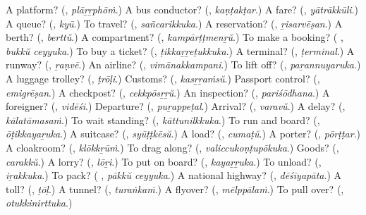 \begin{tcolorbox}[breakable,colback=teal!4,colframe=teal!35!black,title={Before you move on}]
A platform? (\textbf{}, \emph{plāṟṟphōṁ}.) A bus conductor? (\textbf{}, \emph{kaṇṭakṭar}.) A fare? (\textbf{}, \emph{yātrākkūli}.) A queue? (\textbf{}, \emph{kyū}.) To travel? (\textbf{}, \emph{sañcarikkuka}.) A reservation? (\textbf{}, \emph{ṟisarvēṣan}.) A berth? (\textbf{}, \emph{berttŭ}.) A compartment? (\textbf{}, \emph{kampārṭṭmenṟŭ}.) To make a booking? (\textbf{ }, \emph{bukkŭ ceyyuka}.) To buy a ticket? (\textbf{}, \emph{ṭikkaṟṟeṭukkuka}.) A terminal? (\textbf{}, \emph{ṭerminal}.) A runway? (\textbf{}, \emph{ṟaṇvē}.) An airline? (\textbf{}, \emph{vimānakkampani}.) To lift off? (\textbf{}, \emph{paṟannuyaruka}.) A luggage trolley? (\textbf{}, \emph{ṭrōḷi}.) Customs? (\textbf{}, \emph{kasṟṟaṁsŭ}.) Passport control? (\textbf{}, \emph{emigrēṣan}.) A checkpost? (\textbf{}, \emph{cekkpōsṟṟŭ}.) An inspection? (\textbf{}, \emph{pariśōdhana}.) A foreigner? (\textbf{}, \emph{vidēśi}.) Departure? (\textbf{}, \emph{puṟappeṭal}.) Arrival? (\textbf{}, \emph{varavŭ}.) A delay? (\textbf{}, \emph{kālatāmasaṁ}.) To wait standing? (\textbf{}, \emph{kāttunilkkuka}.) To run and board? (\textbf{}, \emph{ōṭikkayaṟuka}.) A suitcase? (\textbf{}, \emph{syūṭṭkēsŭ}.) A load? (\textbf{}, \emph{cumaṭŭ}.) A porter? (\textbf{}, \emph{pōrṭṭar}.) A cloakroom? (\textbf{}, \emph{klōkkṟūṁ}.) To drag along? (\textbf{}, \emph{valiccukoṇṭupōkuka}.) Goods? (\textbf{}, \emph{carakkŭ}.) A lorry? (\textbf{}, \emph{lōṟi}.) To put on board? (\textbf{}, \emph{kayaṟṟuka}.) To unload? (\textbf{}, \emph{iṟakkuka}.) To pack? (\textbf{ }, \emph{pākkŭ ceyyuka}.) A national highway? (\textbf{}, \emph{dēśīyapāta}.) A toll? (\textbf{}, \emph{ṭōḷ}.) A tunnel? (\textbf{}, \emph{turaṅkaṁ}.) A flyover? (\textbf{}, \emph{mēlppālaṁ}.) To pull over? (\textbf{}, \emph{otukkinirttuka}.)
\end{tcolorbox}
